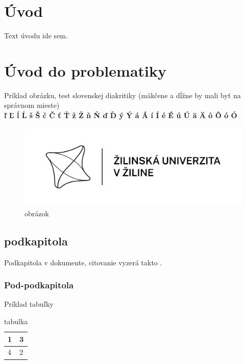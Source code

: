 \documentclass[12pt]{article}
\begin{document}


\newpage %
\thispagestyle{empty}
\tableofcontents
\newpage
\thispagestyle{empty}
\listoffigures
\newpage
\thispagestyle{empty}
\listoftables


\newpage
{}
\setcounter{page}{10} %
\section*{Úvod} %
\hspace{1.25cm}Text úvodu ide sem.

\newpage
\section{Úvod do problematiky}
Príklad obrázku, test slovenskej diakritiky (mäkčene a dĺžne by mali byť na správnom mieste) \\
\textbf{ľ Ľ ĺ Ĺ š Š č Č ť Ť ž Ž ň Ň ď Ď ý Ý á Á í Í é É ú Ú ä Ä ô Ô ó Ó}
\begin{figure}[H] %
\centering
\includegraphics{logo}
\caption{obrázok}
\label{img:obrazok}
\end{figure}
\subsection{podkapitola}
Podkapitola v dokumente, citovanie vyzerá takto \cite{modernrob}.
\subsubsection{Pod-podkapitola}
Príklad tabuľky
\begin{table}[H]
	\centering
	\caption{tabulka}
	\label{tab:my-table}
	\begin{tabular}{|l|l|}
\hline
1 & 3 \\ \hline
4 & 2 \\ \hline
	\end{tabular}	
	\end{table}
\end{document}
